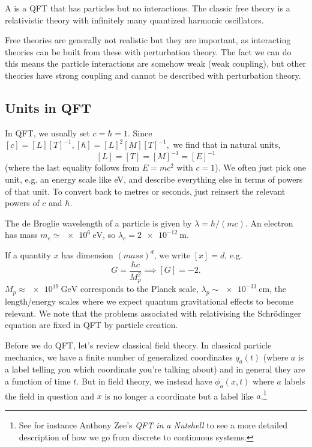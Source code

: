 \begin{defn}
A  is a QFT that has particles but no interactions. The classic free theory is a relativistic theory with infinitely many quantized harmonic oscillators.
\end{defn}
Free theories are generally not realistic but they are important, as interacting theories can be built from these with perturbation theory. The fact we can do this means the particle interactions are somehow weak (weak coupling), but other theories have strong coupling and cannot be described with perturbation theory.

\subsection*{Units in QFT} In QFT, we usually set $c=\hbar=1$. Since $[c]=[L][T]^{-1}, [\hbar]=[L]^2[M][T]^{-1},$ we find that in natural units, $$[L]=[T]=[M]^{-1}=[E]^{-1}$$ (where the last equality follows from $E=mc^2$ with $c=1$). We often just pick one unit, e.g. an energy scale like eV, and describe everything else in terms of powers of that unit. To convert back to metres or seconds, just reinsert the relevant powers of $c$ and $\hbar$.

\begin{exm}
The de Broglie wavelength of a particle is given by $\lambda=\hbar/(mc)$. An electron has mass $m_e\simeq \SI{e6}{\electronvolt}$, so $\lambda_e = \SI{2e-12}{\meter}$.
\end{exm}

If a quantity $x$ has dimension $(mass)^d$, we write $[x]=d$, e.g. $$G=\frac{\hbar c}{M_p^2}\implies [G]=-2.$$  $M_p \approx \SI{e19}{\giga\electronvolt}$ corresponds to the Planck scale, $\lambda_p \sim \SI{e-33}{\centi\meter}$, the length/energy scales where we expect quantum gravitational effects to become relevant. We note that the problems associated with relativising the Schr\"odinger equation are fixed in QFT by particle creation.

Before we do QFT, let's review classical field theory. In classical particle mechanics, we have a finite number of generalized coordinates $q_a(t)$ (where $a$ is a label telling you which coordinate you're talking about) and in general they are a function of time $t$. But in field theory, we instead have $\phi_a(x,t)$ where $a$ labels the field in question and $x$ is no longer a coordinate but a label like $a$.\footnote{See for instance Anthony Zee's \textit{QFT in a Nutshell} to see a more detailed description of how we go from discrete to continuous systems.}

